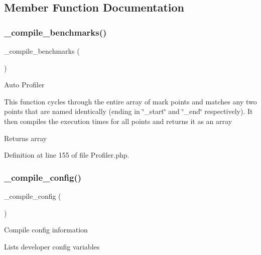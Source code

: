 \subsection{Member Function Documentation}
\mbox{\label{class_c_i___profiler_acecf392de9d6129d3843c64fca7a4766}} 
\subsubsection{\texorpdfstring{\_compile\_benchmarks()}{\_compile\_benchmarks()}}
{\footnotesize\ttfamily \+\_\+compile\+\_\+benchmarks (\begin{DoxyParamCaption}{ }\end{DoxyParamCaption})\hspace{0.3cm}{\ttfamily [protected]}}

Auto Profiler

This function cycles through the entire array of mark points and matches any two points that are named identically (ending in \char`\"{}\+\_\+start\char`\"{} and \char`\"{}\+\_\+end\char`\"{} respectively). It then compiles the execution times for all points and returns it as an array

\begin{DoxyReturn}{Returns}
array 
\end{DoxyReturn}


Definition at line 155 of file Profiler.\+php.

\mbox{\label{class_c_i___profiler_affb7543f1c67a5b3ff24eaefcec37e6d}} 
\subsubsection{\texorpdfstring{\_compile\_config()}{\_compile\_config()}}
{\footnotesize\ttfamily \+\_\+compile\+\_\+config (\begin{DoxyParamCaption}{ }\end{DoxyParamCaption})\hspace{0.3cm}{\ttfamily [protected]}}

Compile config information

Lists developer config variables

